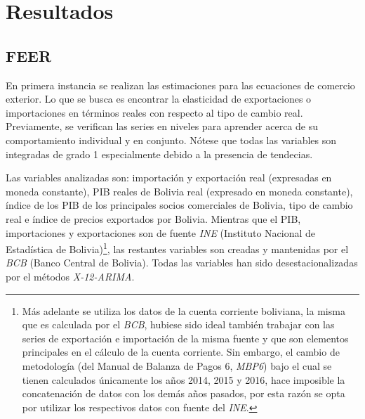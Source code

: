 \documentclass[12pt,letterpaper]{article}
\begin{document}
\section{Resultados}\label{calc}
\subsection{FEER}

En primera instancia se realizan las estimaciones para las ecuaciones de comercio exterior. Lo que se busca es encontrar la elasticidad de exportaciones o importaciones en términos reales con respecto al tipo de cambio real. Previamente, se verifican las series en niveles para aprender acerca de su comportamiento individual y en conjunto. Nótese que todas las variables son integradas de grado 1 especialmente debido a la presencia de tendecias.

Las variables analizadas son: importación y exportación real (expresadas en moneda constante), PIB reales de Bolivia real (expresado en moneda constante), índice de los PIB de los principales socios comerciales de Bolivia, tipo de cambio real e índice de precios exportados por Bolivia. Mientras que el PIB, importaciones y exportaciones son de fuente \emph{INE} (Instituto Nacional de Estadística de Bolivia)\footnote{Más adelante se utiliza los datos de la cuenta corriente boliviana, la misma que es calculada por el \emph{BCB}, hubiese sido ideal también trabajar con las series de exportación e importación de la misma fuente y que son elementos principales en el cálculo de la cuenta corriente. Sin embargo, el cambio de metodología (del Manual de Balanza de Pagos 6, \emph{MBP6}) bajo el cual se tienen calculados únicamente los años 2014, 2015 y 2016, hace imposible la concatenación de datos con los demás años pasados, por esta razón se opta por utilizar los respectivos datos con fuente del \emph{INE}.}, las restantes variables son creadas y mantenidas por el \emph{BCB} (Banco Central de Bolivia). Todas las variables han sido desestacionalizadas por el métodos \emph{X-12-ARIMA}.
\end{document}

